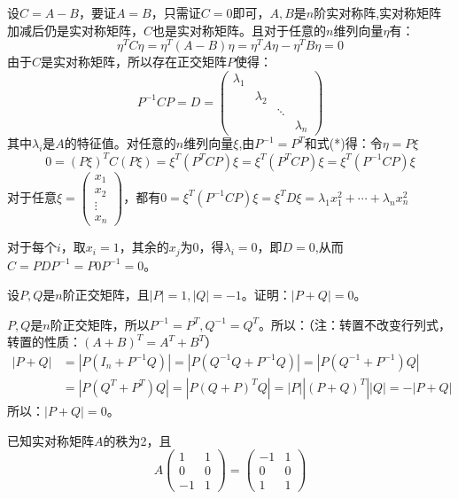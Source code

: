 \documentclass[a4paper]{report}
\begin{document}
\begin{zhengming}
设$C=A-B$，要证$A=B$，只需证$C=0$即可，$A,B$是$n$阶实对称阵,实对称矩阵加减后仍是实对称矩阵，$C$也是实对称矩阵。且对于任意的$n$维列向量$\eta$有：
\begin{equation*}
\eta^TC\eta=\eta^T(A-B)\eta=\eta^TA\eta-\eta^TB\eta=0\tag{*}
\end{equation*}
由于$C$是实对称矩阵，所以存在正交矩阵$P$使得：
\begin{equation*}
P^{-1}CP=D
=\begin{pmatrix}
\lambda_1\\
&\lambda_2\\
&&\ddots\\
&&&\lambda_n
\end{pmatrix}
\end{equation*}
其中$\lambda_i$是$A$的特征值。对任意的$n$维列向量$\xi$,由$P^{-1}=P^T$和式(*)得：令$\eta=P\xi$
\begin{equation*}
  0=(P\xi)^TC(P\xi)=\xi^T(P^TCP)\xi=\xi^T(P^TCP)\xi=\xi^{T}(P^{-1}CP)\xi
\end{equation*}
对于任意$\xi=
\begin{pmatrix}
x_1\\x_2\\ \vdots\\x_n
\end{pmatrix}
$，都有$0=\xi^T(P^{-1}CP)\xi=\xi^TD\xi=\lambda_1x_1^2+\cdots+\lambda_nx_n^2$

对于每个$i$，取$x_i=1$，其余的$x_j$为0，得$\lambda_i=0$，即$D=0$,从而$C=PDP^{-1}=P0P^{-1}=0$。
\end{zhengming}

\EX 设$P,Q$是$n$阶正交矩阵，且$|P|=1,|Q|=-1$。证明：$|P+Q|=0$。

\begin{zhengming}
$P,Q$是$n$阶正交矩阵，所以$P^{-1}=P^T,Q^{-1}=Q^{T}$。所以：（注：转置不改变行列式，转置的性质：$(A+B)^T=A^T+B^T$）
\begin{align*}
|P+Q|&=|P(I_n+P^{-1}Q)|=|P(Q^{-1}Q+P^{-1}Q)|=|P(Q^{-1}+P^{-1})Q|\\
&=|P(Q^T+P^T)Q|=|P(Q+P)^TQ|=|P||(P+Q)^T||Q|=-|P+Q|
\end{align*}
所以：$|P+Q|=0$。
\end{zhengming}

\EX 已知实对称矩阵$A$的秩为2，且
\begin{equation*}
A\begin{pmatrix}
1&1\\
0&0\\
-1&1
 \end{pmatrix}=
 \begin{pmatrix}
-1&1\\
0&0\\
1&1
 \end{pmatrix}
\end{equation*}
\end{document}
